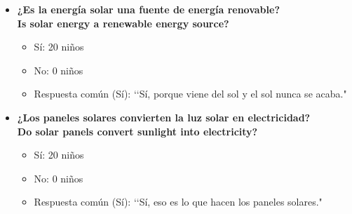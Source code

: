 \documentclass[12pt]{article}
\begin{document}
\begin{itemize}
      \item \textbf{¿Es la energía solar una fuente de energía renovable?}\\
            \textbf{Is solar energy a renewable energy source?}
            \begin{itemize}
                  \item Sí: 20 niños
                  \item No: 0 niños
                  \item Respuesta común (Sí): \lq\lq Sí, porque viene del sol y el sol nunca se acaba."
            \end{itemize}
            \begin{minipage}{\linewidth}
                  \centering
                  \begin{minipage}{0.5\linewidth}
                  \end{minipage}%
            \end{minipage}

      \item \textbf{¿Los paneles solares convierten la luz solar en electricidad?}\\
            \textbf{Do solar panels convert sunlight into electricity?}
            \begin{itemize}
                  \item Sí: 20 niños
                  \item No: 0 niños
                  \item Respuesta común (Sí): \lq\lq Sí, eso es lo que hacen los paneles solares."
            \end{itemize}
            \begin{minipage}{\linewidth}
                  \centering
                  \begin{minipage}{0.5\linewidth}
                  \end{minipage}%
            \end{minipage}


\end{itemize}
\end{document}
